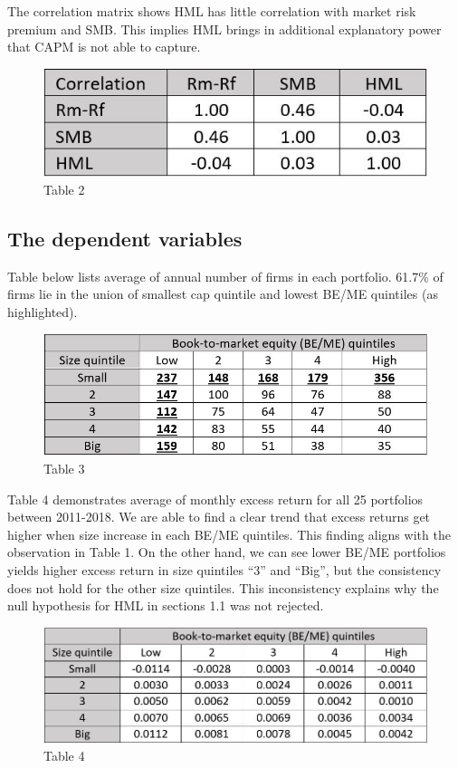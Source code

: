 \documentclass[12pt]{article}
\begin{document}
\noindent The correlation matrix shows HML has little correlation with market risk premium and SMB. This implies HML brings in additional explanatory power that CAPM is not able to capture.

\begin{figure}[h]
	\centering
	\includegraphics[width=0.35\linewidth]{2.JPG}
	\caption*{Table 2}
	\label{fig:label}
\end{figure}


\subsection{The dependent variables}   

Table below lists average of annual number of firms in each portfolio. 61.7\% of firms lie in the union of smallest cap quintile and lowest BE/ME quintiles (as highlighted).



\begin{figure}[h]
	\centering
	\includegraphics[width=0.5\linewidth]{3.JPG}
	\caption*{Table 3}
	\label{fig:label}
\end{figure}

\noindent Table 4 demonstrates average of monthly excess return for all 25 portfolios between 2011-2018. We are able to find a clear trend that excess returns get higher when size increase in each BE/ME quintiles. This finding aligns with the observation in Table 1. On the other hand, we can see lower BE/ME portfolios yields higher excess return in size quintiles “3” and “Big”, but the consistency does not hold for the other size quintiles. This inconsistency explains why the null hypothesis for HML in sections 1.1 was not rejected.

\begin{figure}[h]
	\centering
	\includegraphics[width=0.55\linewidth]{4.JPG}
	\caption*{Table 4}
	\label{fig:label}
\end{figure}
\end{document}
